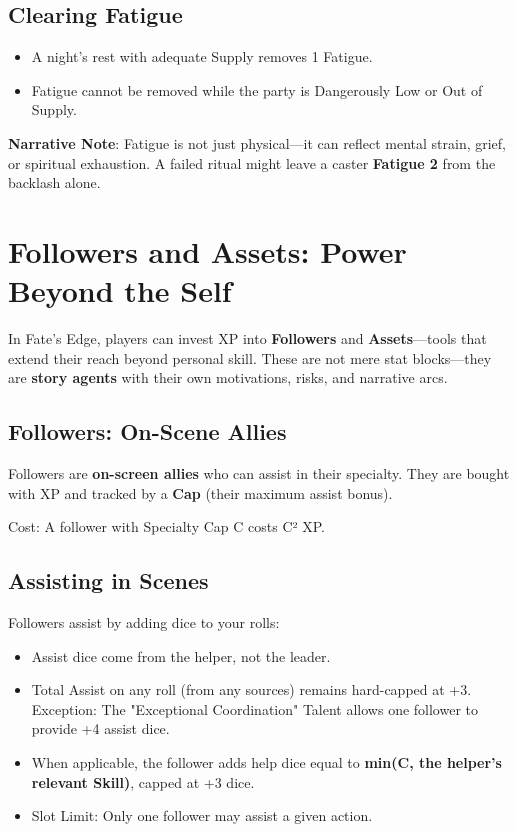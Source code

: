 \subsection*{Clearing Fatigue}

\begin{itemize}
    \item A night's rest with adequate Supply removes 1 Fatigue.
    \item Fatigue cannot be removed while the party is Dangerously Low or Out of Supply.
\end{itemize}

\textbf{Narrative Note}: Fatigue is not just physical---it can reflect mental strain, grief, or spiritual exhaustion. A failed ritual might leave a caster \textbf{Fatigue 2} from the backlash alone.

\section*{Followers and Assets: Power Beyond the Self}

In Fate's Edge, players can invest XP into \textbf{Followers} and \textbf{Assets}---tools that extend their reach beyond personal skill. These are not mere stat blocks---they are \textbf{story agents} with their own motivations, risks, and narrative arcs.

\subsection*{Followers: On-Scene Allies}

Followers are \textbf{on-screen allies} who can assist in their specialty. They are bought with XP and tracked by a \textbf{Cap} (their maximum assist bonus).

Cost: A follower with Specialty Cap C costs C² XP.

\subsection*{Assisting in Scenes}

Followers assist by adding dice to your rolls:

\begin{itemize}
    \item Assist dice come from the helper, not the leader.
    \item Total Assist on any roll (from any sources) remains hard-capped at +3. Exception: The "Exceptional Coordination" Talent allows one follower to provide +4 assist dice.
    \item When applicable, the follower adds help dice equal to \textbf{min(C, the helper's relevant Skill)}, capped at +3 dice.
    \item Slot Limit: Only one follower may assist a given action.
\end{itemize}

